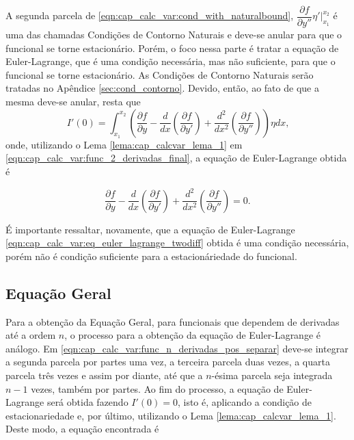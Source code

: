 \documentclass[
	12pt,				%
	openright,			%
    twoside,			%
	a4paper,			%
	english,			%
	french,				%
	spanish,			%
	brazil				%
	]{abntex2}
\numberwithin{lema}{chapter}
\numberwithin{teorema}{chapter}
\numberwithin{definicao}{chapter}
\numberwithin{exemplo}{chapter}
\numberwithin{figure}{chapter}
\begin{document}
A segunda parcela de \eqref{eqn:cap_calc_var:cond_with_naturalbound}, $\dfrac{\partial f}{\partial y''}\eta '\Big|_{x_1}^{x_2}$ é uma das chamadas Condições de Contorno Naturais e deve-se anular para que o funcional se torne estacionário. Porém, o foco nessa parte é tratar a equação de Euler-Lagrange, que é uma condição necessária, mas não suficiente, para que o funcional se torne estacionário. As Condições de Contorno Naturais serão tratadas no Apêndice \ref{sec:cond_contorno}. Devido, então, ao fato de que a mesma deve-se anular, resta que
\begin{equation}
	\label{eqn:cap_calc_var:func_2_derivadas_final}
	I'(0)=
	\int_{x_1}^{x_2}
	\left (
		\frac{\partial f}{\partial y}
	-
		\frac{d}{dx}\left (
			\frac{\partial f}{\partial y'}
		\right )
	+
		\frac{d^2}{dx^2}\left (
			\frac{\partial f}{\partial y''}
		\right )
	\right ) \eta dx
	\text{,}
\end{equation}
onde, utilizando o Lema \ref{lema:cap_calcvar_lema_1} em \eqref{eqn:cap_calc_var:func_2_derivadas_final}, a equação de Euler-Lagrange obtida é

\begin{equation}
	\label{eqn:cap_calc_var:eq_euler_lagrange_twodiff}
	\frac{\partial f}{\partial y}
	-
	\frac{d}{dx}\left (
		\frac{\partial f}{\partial y'}
	\right )
	+
	\frac{d^2}{dx^2}\left (
		\frac{\partial f}{\partial y''}
	\right )
	=0 \text{.}
\end{equation}

É importante ressaltar, novamente, que a equação de Euler-Lagrange \eqref{eqn:cap_calc_var:eq_euler_lagrange_twodiff} obtida é uma condição necessária, porém não é condição suficiente para a estacionáriedade do funcional.

\subsection{Equação Geral}

Para a obtenção da Equação Geral, para funcionais que dependem de derivadas até a ordem $n$, o processo para a obtenção da equação de Euler-Lagrange é análogo. Em \eqref{eqn:cap_calc_var:func_n_derivadas_pos_separar} deve-se integrar a segunda parcela por partes uma vez, a terceira parcela duas vezes, a quarta parcela três vezes e assim por diante, até que a $n$-ésima parcela seja integrada $n-1$ vezes, também por partes. Ao fim do processo, a equação de Euler-Lagrange será obtida fazendo $I'(0)=0$, isto é, aplicando a condição de estacionariedade e, por último, utilizando o Lema \ref{lema:cap_calcvar_lema_1}. Deste modo, a equação encontrada é
\end{document}
